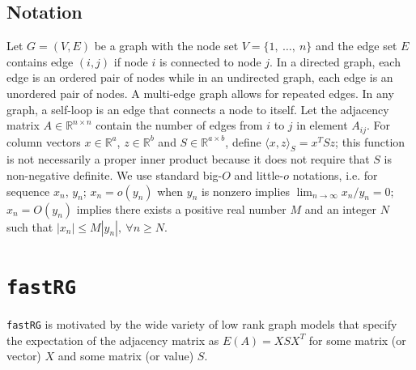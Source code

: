 \documentclass[twoside,11pt]{article}
\begin{document}
\subsection{Notation}
Let $G = (V,E)$ be a graph with the node set $V = \{1, \ \dots,\ n\}$ and the edge set $E$ contains edge $(i,j)$ if node $i$ is connected to node $j$. In a directed graph, each edge is an ordered pair of nodes while in an undirected graph, each edge is an unordered pair of nodes. A multi-edge graph allows for repeated edges. In any graph, a self-loop is an edge that connects a node to itself. Let the adjacency matrix $A \in \mathds{R}^{n\times n}$ contain the number of edges from $i$ to $j$ in element $A_{ij}$.  For column vectors $x \in \mathds{R}^a$, $z \in \mathds{R}^b$ and $S \in \mathds{R}^{a \times b}$, define $\langle x, z \rangle _S = x^T S z$;  this function is not necessarily a proper inner product because it does not require that $S$ is non-negative definite. 
We use standard big-$O$ and little-$o$ notations,
i.e. for sequence $x_n$, $y_n$; $x_n = o(y_n)$ when $y_n$ is nonzero implies $\lim_{n\rightarrow \infty}x_n/y_n=0$; $x_n = O(y_n)$ implies there exists a positive real number $M$ and an integer $N$ such that $|x_n| \leq M|y_n|, ~\forall n \geq N.$






\section{\texttt{fastRG}}
\label{fastRG}
\texttt{fastRG} is motivated by the 
 wide variety of low rank graph models that specify the expectation of the adjacency matrix as $E(A) = XSX^T$ for some matrix (or vector) $X$ and some matrix (or value) $S$.  
\end{document}
